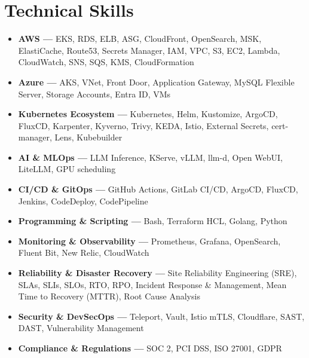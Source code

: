 \documentclass[11pt,a4paper,sans]{moderncv}
\begin{document}
\section{Technical Skills}
{\begin{itemize}[label=\textbullet, topsep=4pt, itemsep=2pt, parsep=0pt]
\item {\textbf{AWS —} EKS, RDS, ELB, ASG, CloudFront, OpenSearch, MSK, ElastiCache, Route53, Secrets Manager, IAM, VPC, S3, EC2, Lambda, CloudWatch, SNS, SQS, KMS, CloudFormation}
\item {\textbf{Azure —} AKS, VNet, Front Door, Application Gateway, MySQL Flexible Server, Storage Accounts, Entra ID, VMs}
\item {\textbf{Kubernetes Ecosystem —} Kubernetes, Helm, Kustomize, ArgoCD, FluxCD, Karpenter, Kyverno, Trivy, KEDA, Istio, External Secrets, cert-manager, Lens, Kubebuilder}
\item {\textbf{AI \& MLOps —} LLM Inference, KServe, vLLM, llm-d, Open WebUI, LiteLLM, GPU scheduling}
\item {\textbf{CI/CD \& GitOps —} GitHub Actions, GitLab CI/CD, ArgoCD, FluxCD, Jenkins, CodeDeploy, CodePipeline}
\item {\textbf{Programming \& Scripting —} Bash, Terraform HCL, Golang, Python}
\item {\textbf{Monitoring \& Observability —} Prometheus, Grafana, OpenSearch, Fluent Bit, New Relic, CloudWatch}
\item {\textbf{Reliability \& Disaster Recovery —} Site Reliability Engineering (SRE), SLAs, SLIs, SLOs, RTO, RPO, Incident Response \& Management, Mean Time to Recovery (MTTR), Root Cause Analysis}
\item {\textbf{Security \& DevSecOps —} Teleport, Vault, Istio mTLS, Cloudflare, SAST, DAST, Vulnerability Management}
\item {\textbf{Compliance \& Regulations —} SOC 2, PCI DSS, ISO 27001, GDPR}
\end{itemize}}
\end{document}
